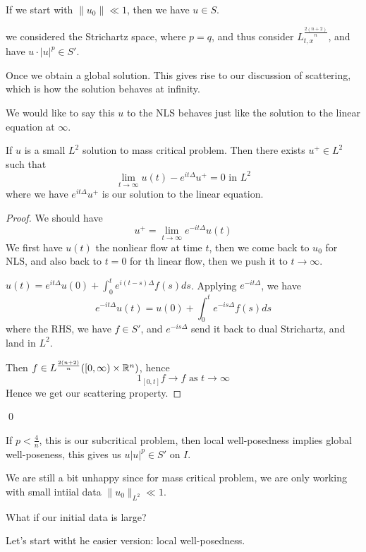 \begin{proposition}
    If we start with $\|u_0\|\ll 1$, then we have $u\in S$.
\end{proposition}
we considered the Strichartz space, where $p=q$, and thus consider $L_{t,x}^\frac{2(n+2)}{n}$, and have $u\cdot |u|^p\in S'$.

Once we obtain a global solution. This gives rise to our discussion of scattering, which is how the solution behaves at infinity.
\begin{remark}
    We would like to say this $u$ to the NLS behaves just like the solution to the linear equation at $\infty$.
\end{remark}
\begin{theorem}[scattering]
    If $u$ is a small $L^2$ solution to mass critical problem. Then there exists $u^+\in L^2$ such that 
    \begin{equation*}
        \lim_{t\to\infty}u(t)-e^{it\Delta}u^+=0 \text{ in } L^2
    \end{equation*}
    where we have $e^{it\Delta}u^+$ is our solution to the linear equation.
\end{theorem}
\begin{proof}
    We should have 
    \begin{equation*}
        u^+=\lim_{t\to\infty}e^{-it\Delta}u(t)
    \end{equation*}
    We first have $u(t)$ the nonliear flow at time $t$, then we come back to $u_0$ for NLS, and also back to $t=0$ for th linear flow, then we push it to $t\to\infty$. 

    $u(t)=e^{it\Delta}u(0)+\int_0^te^{i(t-s)\Delta}f(s)ds$. Applying $e^{-it\Delta}$, we have
    \begin{equation*}
        e^{-it\Delta}u(t)=u(0)+\int_0^te^{-is\Delta}f(s)ds
    \end{equation*}
    where the RHS, we have $f\in S'$, and $e^{-is\Delta}$ send it back to dual Strichartz, and land in $L^2$.

    Then $f\in L^\frac{2(n+2)}{n}([0,\infty)\times \mathbb{R}^n)$, hence
    \begin{equation*}
        1_{[0,t]}f\to f \text{ as } t\to\infty
    \end{equation*}
    Hence we get our scattering property.
\end{proof}
\qed

\begin{note}
    If $p<\frac{4}{n}$, this is our subcritical problem, then local well-posedness implies global well-poseness, this gives us $u|u|^p\in S'$ on $I$. 
\end{note}
We are still a bit unhappy since for mass critical problem, we are only working with small intiial data $\|u_0\|_{L^2}\ll 1$. 
\begin{problem}
    What if our initial data is large?
\end{problem}
Let's start witht he easier version: local well-posedness.


